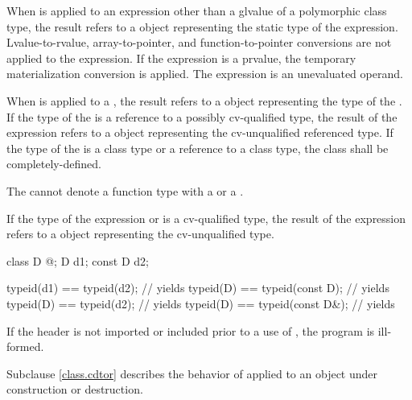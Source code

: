 \pnum
When  is applied to an expression other than a glvalue of
a polymorphic class type, the result refers to a 
object representing the static type of the expression.
Lvalue-to-rvalue, array-to-pointer,
and function-to-pointer conversions are not applied to
the expression.
If the expression is a prvalue,
the temporary materialization conversion
is applied.
The expression is an unevaluated operand.

\pnum
When  is applied to a , the result
refers to a  object representing the type of the
. If the type of the  is a reference
to a possibly cv-qualified type, the result of the
 expression refers to a  object
representing the cv-unqualified referenced type. If the type of
the  is a class type or a reference to a class type,
the class shall be completely-defined.
\begin{note}
The  cannot denote a function type with
a  or a .
\end{note}

\pnum
If the type of the expression or  is a
cv-qualified type, the result of the  expression refers
to a  object representing the cv-unqualified
type.
\begin{example}
\begin{codeblock}
class D { @\commentellip@ };
D d1;
const D d2;

typeid(d1) == typeid(d2);       // yields 
typeid(D)  == typeid(const D);  // yields 
typeid(D)  == typeid(d2);       // yields 
typeid(D)  == typeid(const D&); // yields 
\end{codeblock}
\end{example}

\pnum
If the header 
is not imported or included prior
to a use of , the program is ill-formed.

\pnum
\begin{note}
Subclause \ref{class.cdtor} describes the behavior of 
applied to an object under construction or destruction.
\end{note}

